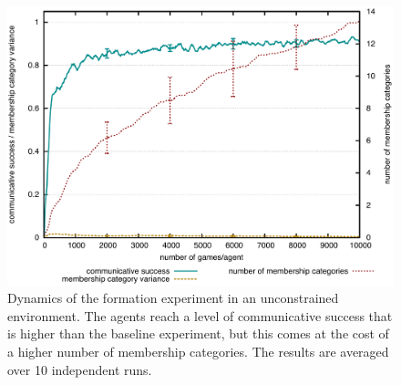 \begin{figure}[htpb]
  \begin{center}
    \includegraphics[width=\textwidth]{./graded-membership/figures/strict-formation.pdf}
    \caption[Dynamics of the formation experiment in an unconstrained
    environment]{Dynamics of the formation experiment in an
      unconstrained environment. The agents reach a level of
      communicative success that is higher than the baseline
      experiment, but this comes at the cost of a higher number of
      membership categories. The results are averaged over 10
      independent runs.}
    \label{f:gm-formation-dynamics}
  \end{center}
\end{figure}

